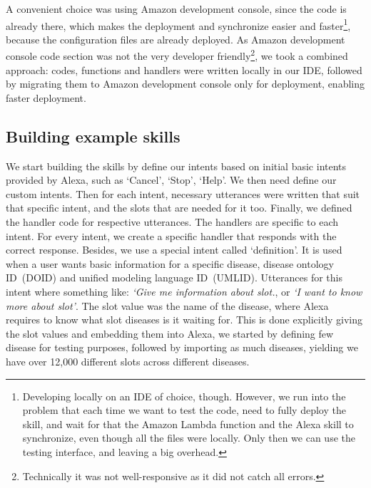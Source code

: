 \documentclass[10pt,journal,compsoc]{IEEEtran}
\begin{document}
A convenient choice was using Amazon development console, since the code is already there, which makes the deployment and synchronize easier and faster\footnote{Developing locally on an IDE of choice, though. However, we run into the problem that each time we want to test the code, need to fully deploy the skill, and wait for that the Amazon Lambda function and the Alexa skill to synchronize, even though all the files were locally. Only then we can use the testing interface, and leaving a big overhead.}, because the configuration files are already deployed. As Amazon development console code section was not the very developer friendly\footnote{Technically it was not well-responsive as it did not catch all errors.}, %
we took a combined approach: codes, functions and handlers were written locally in our IDE, followed by migrating them to Amazon development console only for deployment, enabling faster deployment. %

\subsection{Building example skills}
\noindent We start building the skills by define our intents based on initial basic intents provided by Alexa, such as `Cancel', `Stop', `Help'. We then need define our custom intents. Then for each intent, necessary utterances were written that suit that specific intent, and the slots that are needed for it too. Finally, we defined the handler code for respective utterances. The handlers are specific to each intent. For every intent, we create a specific handler that responds with the correct response. 
Besides, we use a special intent called `definition'. It is used when a user wants basic information for a specific disease, disease ontology ID~(DOID) and unified modeling language ID~(UMLID). %
Utterances for this intent where something like: \textit{`Give me information about {slot}.},  or \textit{`I want to know more about {slot}'}. The slot value was the name of the disease, where Alexa requires to know what slot diseases is it waiting for. This is done explicitly giving the slot values and embedding them into Alexa, we started by defining few disease for testing purposes, followed by importing as much diseases, yielding we have over 12,000 different slots across different diseases. 
\end{document}

